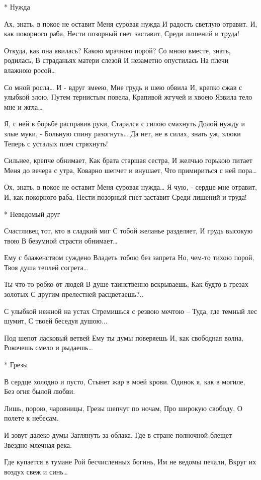 * Нужда

Ах, знать, в покое не оставит
Меня суровая нужда
И радость светлую отравит.
И, как покорного раба,
Нести позорный гнет заставит,
Среди лишений и труда!

Откуда, как она явилась?
Какою мрачною порой?
Со мною вместе, знать, родилась,
В страданьях матери слезой
И незаметно опустилась
На плечи влажною росой…

Со мной росла… И - вдруг змеею,
Мне грудь и шею обвила
И, крепко сжав с улыбкой злою,
Путем тернистым повела,
Крапивой жгучей и хвоею
Язвила тело мне и жгла…

Я, с ней в борьбе расправив руки,
Старался с силою смахнуть
Долой нужду и злые муки, -
Больную спину разогнуть…
Да нет, не в силах, знать уж, злюки
Теперь с усталых плеч стряхнуть!

Сильнее, крепче обнимает,
Как брата старшая сестра,
И желчью горькою питает
Меня до вечера с утра,
Коварно шепчет и внушает,
Что примириться с ней пора…

Ох, знать, в покое не оставит
Меня суровая нужда…
Я чую, - сердце мне отравит,
И, как покорного раба,
Нести позорный гнет заставит
Среди лишений и труда!


* Неведомый друг

Счастливец тот, кто в сладкий миг
С тобой желанье разделяет,
И грудь высокую твою
В безумной страсти обнимает…

Ему с блаженством суждено
Владеть тобою без запрета
Но, чем-то тихою порой,
Твоя душа теплей согрета…

Ты что-то робко от людей
В душе таинственно вскрываешь,
Как будто в грезах золотых
С другим прелестней расцветаешь?..

С улыбкой нежной на устах
Стремишься с резвою мечтою –
Туда, где темный лес шумит,
С твоей беседуя душою...

Под шепот ласковый ветвей
Ему ты думы поверяешь
И, как свободная волна,
Рокочешь смело и рыдаешь…


* Грезы

В сердце холодно и пусто,
Стынет жар в моей крови.
Одинок я, как в могиле,
Без огня былой любви.

Лишь, порою, чаровницы,
Грезы шепчут по ночам,
Про широкую свободу,
О полете к небесам.

И зовут далеко думы
Заглянуть за облака,
Где в стране полночной блещет
Звездно-млечная река.

Где купается в тумане
Рой бесчисленных богинь,
Им не ведомы печали,
Вкруг их воздух свеж и синь…

